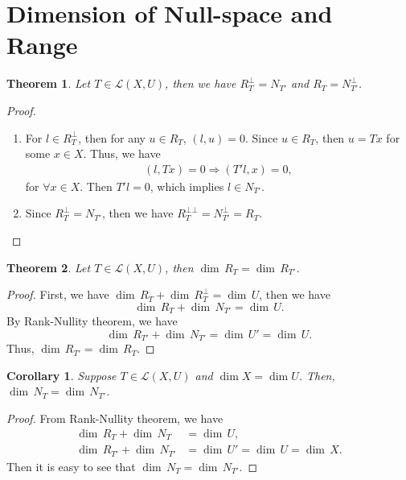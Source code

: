 \documentclass[11pt]{book}
\newtheorem{theorem}{Theorem}[chapter]
\newtheorem{corollary}{Corollary}[theorem]
\theoremstyle{definition}
\numberwithin{equation}{chapter}
\begin{document}
\section{Dimension of Null-space and Range}
\begin{theorem}\label{theorem_371}
Let $T\in \mathscr{L}(X,U)$, then we have $R_T^\bot = N_{T'}$ and $R_T = N_{T'}^\bot$.
\end{theorem}
\begin{proof}
~\begin{enumerate}[label=(\alph*)]
    \item For $l\in R_T^\bot$, then for any $u\in R_T$, $(l,u) = 0$. Since $u\in R_T$, then $u = T x$ for some $x\in X$. Thus, we have
    \begin{align*}
        (l, T x) = 0 \Rightarrow (T' l, x) = 0,
    \end{align*}
    for $\forall x\in X$. Then $T' l = 0$, which implies $l\in N_{T'}$.
    \item Since $R_T^\bot = N_{T'}$, then we have $R_T^{\bot\bot} = N_{T'}^\bot = R_T$.
\end{enumerate}
\end{proof}

\medskip

\begin{theorem}
Let $T\in \mathscr{L}(X,U)$, then $ \dim \,R_T =  \dim \,R_{T'}$.
\end{theorem}
\begin{proof}
First, we have $ \dim \,R_T +  \dim \,R_T^\bot =  \dim \,U$, then we have $$ \dim \,R_T +  \dim \,N_{T'} =  \dim \,U.$$
By Rank-Nullity theorem, we have $$ \dim \,R_{T'} +  \dim \,N_{T'} =  \dim \,U' =  \dim \,U.$$ 
Thus, $ \dim \,R_{T'} =  \dim \,R_{T}$.
\end{proof}

\medskip

\begin{corollary}
Suppose $T\in \mathscr{L}(X,U)$ and $ \dim  X =  \dim  U$. Then, $ \dim \,N_T =  \dim \,N_{T'}$.
\end{corollary}
\begin{proof}
From Rank-Nullity theorem, we have 
\begin{align*}
     \dim \,R_T +  \dim \,N_T & =  \dim \,U, \\
     \dim \,R_{T'} +  \dim \,N_{T'} & =  \dim \,U' =  \dim \,U =  \dim \,X.
\end{align*}
Then it is easy to see that $ \dim \,N_T =  \dim \,N_{T'}$.
\end{proof}
\end{document}

